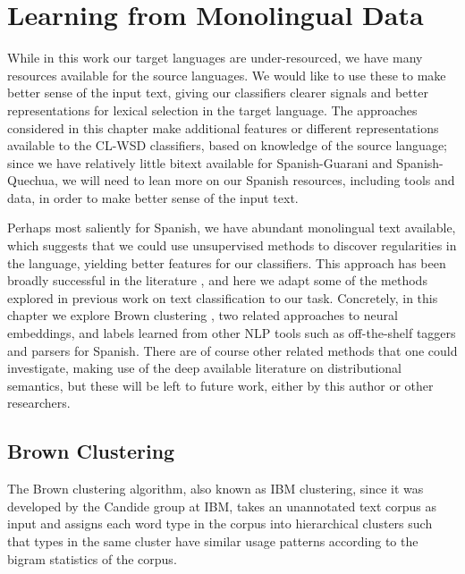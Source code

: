 \chapter{Learning from Monolingual Data}
\label{chap:monolingual}
While in this work our target languages are under-resourced, we have many
resources available for the source languages. We would like to use these to make
better sense of the input text, giving our classifiers clearer signals and
better representations for lexical selection in the target language.  The
approaches considered in this chapter make additional features or different
representations available to the CL-WSD classifiers, based on knowledge of the
source language; since we have relatively little bitext available for
Spanish-Guarani and Spanish-Quechua, we will need to lean more on our Spanish
resources, including tools and data, in order to make better sense of the input
text.

Perhaps most saliently for Spanish, we have abundant monolingual text
available, which suggests that we could use unsupervised methods to discover
regularities in the language, yielding better features for our classifiers.
This approach has been broadly successful in the literature
\cite{turian-ratinov-bengio:2010:ACL}
, and here we adapt some of the methods explored in previous work on text
classification to our task. Concretely, in this chapter we explore Brown
clustering \cite{brown1992class}, two related approaches to neural embeddings,
and labels learned from other NLP tools such as off-the-shelf taggers and
parsers for Spanish. There are of course other related methods that one could
investigate, making use of the deep available literature on distributional
semantics, but these will be left to future work, either by this author or other
researchers.


\section{Brown Clustering}
The Brown clustering algorithm, also known as IBM clustering, since it was
developed by the Candide group at IBM, takes an unannotated text corpus as
input and assigns each word type in the corpus into hierarchical clusters such
that types in the same cluster have similar usage patterns according to the
bigram statistics of the corpus.

